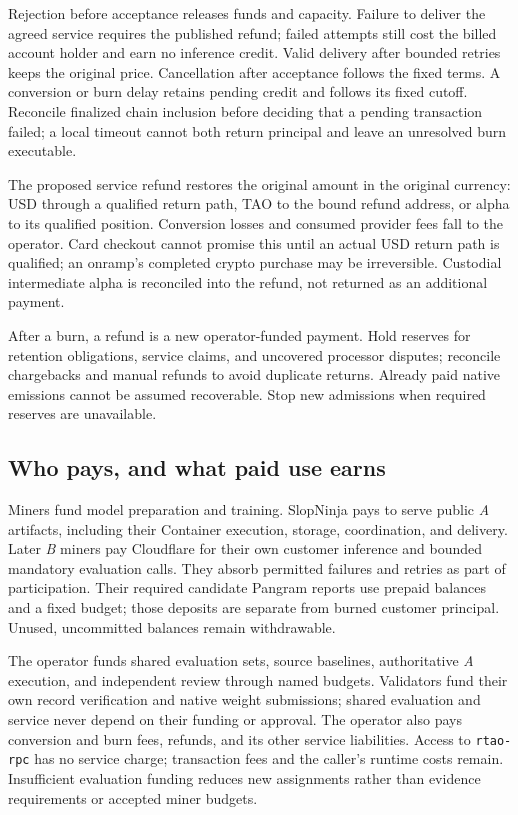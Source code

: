 Rejection before acceptance releases funds and capacity. Failure to deliver
the agreed service requires the published refund; failed attempts still cost
the billed account holder and earn no inference credit. Valid delivery after
bounded retries keeps the original price. Cancellation after acceptance follows
the fixed terms. A conversion or burn delay retains pending credit and follows
its fixed cutoff. Reconcile finalized chain inclusion before deciding that
a pending transaction failed; a local timeout cannot both return principal
and leave an unresolved burn executable.

The proposed service refund restores the original amount in the original
currency: USD through a qualified return path, TAO to the bound refund address,
or alpha to its qualified position. Conversion losses and consumed provider
fees fall to the operator. Card checkout cannot promise this until an actual
USD return path is qualified; an onramp's completed crypto purchase may be
irreversible. Custodial intermediate alpha is reconciled into the refund,
not returned as an additional payment.

After a burn, a refund is a new operator-funded payment. Hold reserves for
retention obligations, service claims, and uncovered processor disputes;
reconcile chargebacks and manual refunds to avoid duplicate returns. Already
paid native emissions cannot be assumed recoverable. Stop new admissions when
required reserves are unavailable.

\subsection{Who pays, and what paid use earns}\label{revenue-and-costs}

Miners fund model preparation and training. SlopNinja pays to serve public
\textit{A} artifacts, including their Container execution, storage,
coordination, and delivery. Later \textit{B} miners pay Cloudflare for their own customer
inference and bounded mandatory evaluation calls. They absorb permitted
failures and retries as part of participation. Their required candidate
Pangram reports use prepaid balances and a fixed budget; those deposits are
separate from burned customer principal. Unused, uncommitted balances remain
withdrawable.

The operator funds shared evaluation sets, source baselines,
authoritative \textit{A} execution, and independent review through named budgets.
Validators fund their own record verification and native weight submissions;
shared evaluation and service never depend on their funding or approval.
The operator also pays conversion and burn fees, refunds, and its other service
liabilities. Access to \texttt{rtao-rpc} has no service charge; transaction fees
and the caller's runtime costs remain. Insufficient evaluation funding reduces
new assignments rather than evidence requirements or accepted miner budgets.

